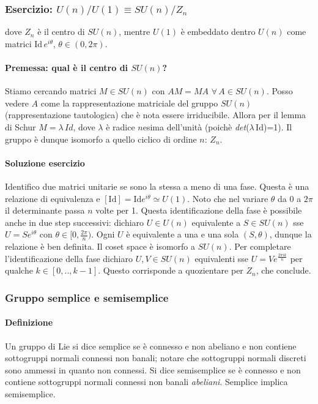 \documentclass[12pt,oneside,notitlepage,abstracton,a4paper]{scrartcl}
\begin{document}
\subsubsection{Esercizio: $U(n)/U(1) \equiv SU(n)/Z_n$}
dove $Z_n$ è il centro di $SU(n)$, mentre $U(1)$ è embeddato dentro $U(n)$ come matrici $\mathrm{Id}\, e^{i\theta}$, $\theta\in (0,2\pi)$.

\paragraph{Premessa: qual è il centro di $SU(n)$?} Stiamo cercando matrici $M\in SU(n)$ con $AM = MA$ $\forall\,A \in SU(n)$. Posso vedere $A$ come la rappresentazione matriciale del gruppo $SU(n)$ (rappresentazione tautologica) che è nota essere irriducibile. Allora per il lemma di Schur $M= \lambda\, Id$, dove $\lambda$ è radice $n$esima dell'unità (poichè \emph{det}($\lambda\,\mathrm{Id}$)=1). Il gruppo è dunque isomorfo a quello ciclico di ordine $n$: $Z_n$.

\paragraph{Soluzione esercizio} Identifico due matrici unitarie se sono la stessa a meno di una fase. Questa è una relazione di equivalenza e $[\mathrm{Id}] = \mathrm{Id} e^{i\theta}\simeq U(1)$. Noto che nel variare $\theta$ da 0 a $2\pi$ il determinante passa $n$ volte per 1. Questa identificazione della fase è possibile anche in due step successivi: dichiaro $U\in U(n)$ equivalente a $S\in SU(n)$ sse $U=S e^{i\theta}$ con $\theta \in [0,\frac{2\pi}{n})$. Ogni $U$ è equivalente a una e una sola $(S,\theta)$, dunque la relazione è ben definita. Il coset space è isomorfo a $SU(n)$. Per completare l'identificazione della fase dichiaro $U,V\in SU(n)$ equivalenti sse $U=V e^{\frac{2\pi i k}{n}}$ per qualche $k\in[0,..,k-1]$. Questo corrisponde a quozientare per $Z_n$, che conclude.

\subsubsection{Gruppo semplice e semisemplice}
\paragraph{Definizione} Un gruppo di Lie si dice semplice se è connesso e non abeliano e non contiene sottogruppi normali connessi non banali; notare che sottogruppi normali discreti sono ammessi in quanto non connessi. Si dice semisemplice se è connesso e non contiene sottogruppi normali connessi non banali \emph{abeliani}. Semplice implica semisemplice.
\end{document}

